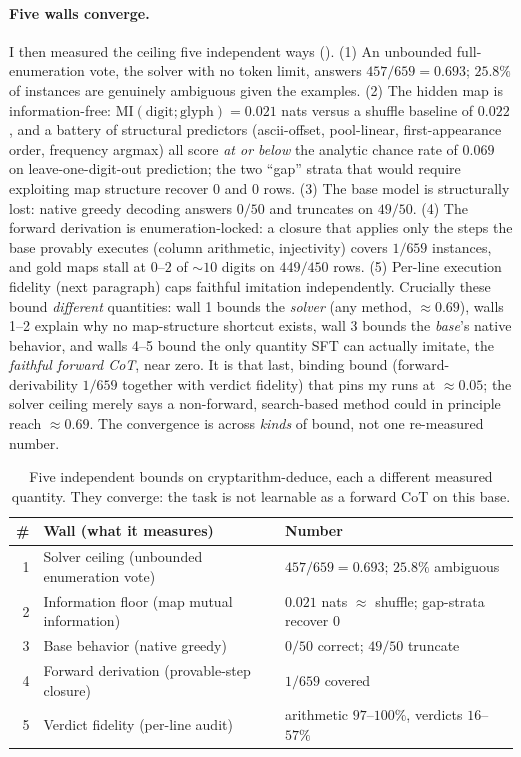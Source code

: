 \documentclass[11pt]{article}
\begin{document}
\paragraph{Five walls converge.} I then measured the ceiling five independent ways
(). (1) An unbounded full-enumeration vote, the solver with no token
limit, answers $457/659 = 0.693$; $25.8\%$ of instances are genuinely ambiguous given the
examples. (2) The hidden map is information-free: $\mathrm{MI}(\text{digit};\text{glyph})
=0.021$ nats versus a shuffle baseline of $0.022$, and a battery of structural predictors
(ascii-offset, pool-linear, first-appearance order, frequency argmax) all score \emph{at or
below} the analytic chance rate of $0.069$ on leave-one-digit-out prediction; the two
``gap'' strata that would require exploiting map structure recover $0$ and $0$ rows. (3) The
base model is structurally lost: native greedy decoding answers $0/50$ and truncates on
$49/50$. (4) The forward derivation is enumeration-locked: a closure that applies only the
steps the base provably executes (column arithmetic, injectivity) covers $1/659$ instances,
and gold maps stall at $0$--$2$ of $\sim\!10$ digits on $449/450$ rows. (5) Per-line
execution fidelity (next paragraph) caps faithful imitation independently. Crucially these
bound \emph{different} quantities: wall 1 bounds the \emph{solver} (any method, $\approx0.69$),
walls 1--2 explain why no map-structure shortcut exists, wall 3 bounds the \emph{base}'s
native behavior, and walls 4--5 bound the only quantity SFT can actually imitate, the
\emph{faithful forward CoT}, near zero. It is that last, binding bound (forward-derivability
$1/659$ together with verdict fidelity) that pins my runs at $\approx0.05$; the solver
ceiling merely says a non-forward, search-based method could in principle reach $\approx0.69$.
The convergence is across \emph{kinds} of bound, not one re-measured number.

\begin{table}[tbp]
\centering
\caption{Five independent bounds on cryptarithm-deduce, each a different measured quantity.
They converge: the task is not learnable as a forward CoT on this base.}
\label{tab:walls}
\small
\begin{tabular}{r l l}
\toprule
\# & Wall (what it measures) & Number \\
\midrule
1 & Solver ceiling (unbounded enumeration vote) & $457/659 = 0.693$; $25.8\%$ ambiguous \\
2 & Information floor (map mutual information) & $0.021$ nats $\approx$ shuffle; gap-strata recover $0$ \\
3 & Base behavior (native greedy) & $0/50$ correct; $49/50$ truncate \\
4 & Forward derivation (provable-step closure) & $1/659$ covered \\
5 & Verdict fidelity (per-line audit) & arithmetic $97$--$100\%$, verdicts $16$--$57\%$ \\
\bottomrule
\end{tabular}
\end{table}
\end{document}

